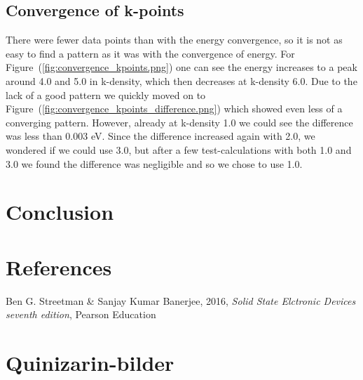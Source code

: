 \documentclass{article}
\begin{document}
  \subsection{Convergence of k-points}

    There were fewer data points than with the energy convergence, so it is not as easy to find a pattern as it was with the convergence of energy. For Figure~(\ref{fig:convergence_kpoints.png}) one can see the energy increases to a peak around 4.0 and 5.0 in k-density, which then decreases at k-density 6.0. Due to the lack of a good pattern we quickly moved on to Figure~(\ref{fig:convergence_kpoints_difference.png}) which showed even less of a converging pattern. However, already at k-density 1.0 we could see the difference was less than 0.003 eV. Since the difference increased again with 2.0, we wondered if we could use 3.0, but after a few test-calculations with both 1.0 and 3.0 we found the difference was negligible and so we chose to use 1.0.

\vspace{1cm}

\section{Conclusion}    \label{sec:Conclusion}


\vspace{1cm}

\section{References} \label{sec:References}

    \begin{thebibliography}{}

    Ben G. Streetman \& Sanjay Kumar Banerjee, 2016, \textit{Solid State Elctronic Devices seventh edition}, Pearson Education


    \end{thebibliography}



\appendix

\iffalse

\section{Quinizarin-bilder}
\end{document}
